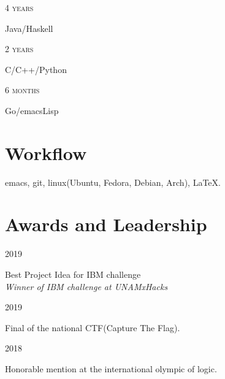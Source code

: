 \documentclass{article}
\newcommand{\TSkills}[3]{
  \begin{minipage}[t]{.15\textwidth}
    \hfill \textsc{#1}\\
  \end{minipage}
  \hfill\vline\hfill
  \begin{minipage}[t]{.80\textwidth}
    #2\\
    \textit{#3}
  \end{minipage}
}
\begin{document}
\TSkills{4 years}
        {Java/Haskell}
        {}

\TSkills{2 years}
        {C/C++/Python}
        {}

\TSkills{6 months}
        {Go/emacsLisp}
        {}

\section{Workflow}
emacs, git, linux(Ubuntu, Fedora, Debian, Arch), \LaTeX.

\section{Awards and Leadership}
\TSkills{2019}
        {Best Project Idea for IBM challenge}
        {Winner of IBM challenge at UNAMxHacks}

\TSkills{2019}
        {Final of the national CTF(Capture The Flag).}
        {}

\TSkills{2018}
        {Honorable mention at the international olympic of logic.}
        {}
\end{document}
